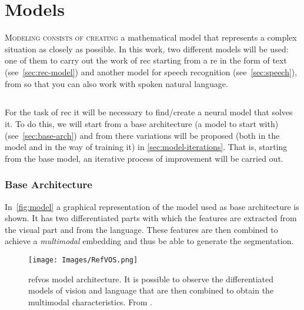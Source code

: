 

\chapter{Models}\label{cha:models}



\lettrine{M}{odeling consists of creating} a mathematical model that represents
a complex situation as closely as possible. In this work, two different models
will be used: one of them to carry out the work of \gls{rec} starting from a
\gls{re} in the form of text (see\ \vref{sec:rec-model}) and another model for
speech recognition (see\ \vref{sec:speech}), from so that you can also work with
spoken natural language.



\section{}\label{sec:rec-model}

For the task of \gls{rec} it will be necessary to find/create a neural model
that solves it. To do this, we will start from a base architecture (a model to
start with) (see\ \vref{sec:base-arch}) and from there variations will be
proposed (both in the model and in the way of training it) in
\vref{sec:model-iterations}. That is, starting from the base model, an
iterative process of improvement will be carried out.


\subsection{Base Architecture}\label{sec:base-arch}

In\ \vref{fig:model} a graphical representation of the model used as base
architecture is shown. It has two differentiated parts with which the features
are extracted from the visual part and from the language. These features are
then combined to achieve a \emph{multimodal} embedding and thus be able to
generate the segmentation.

\begin{figure}[ht]
  \centering
  \texttt{[image: Images/RefVOS.png]}
  \caption[ model architecture]{\gls{refvos} model
    architecture. It is possible to observe the differentiated models of vision
    and language that are then combined to obtain the multimodal
    characteristics. From .}%
  \label{fig:model}
\end{figure}

